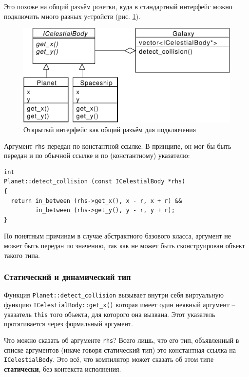 \documentclass[a4paper,12pt,oneside]{article}
\begin{document}
Это похоже на общий разъём розетки, куда в стандартный интерфейс можно подключить много разных уcтройств (рис. \ref{fig:common-intf}).

\begin{figure}[ht]
\centering
\includegraphics[width=1.0\textwidth]{illustrations/common-intf-crop.pdf}
\caption{Открытый интерфейс как общий разъём для подключения}
\label{fig:common-intf}
\end{figure}

Аргумент \lstinline!rhs! передан по константной ссылке. В принципе, он мог бы быть передан и по обычной ссылке и по (константному) указателю:

\begin{lstlisting}
int 
Planet::detect_collision (const ICelestialBody *rhs)
{
  return in_between (rhs->get_x(), x - r, x + r) && 
         in_between (rhs->get_y(), y - r, y + r);
}
\end{lstlisting}

По понятным причинам в случае абстрактного базового класса, аргумент не может быть передан по значению, так как не может быть сконструирован объект такого типа.

\subsubsection{Статический и динамический тип}\label{StatDynPoly}

Функция \lstinline!Planet::detect_collision! вызывает внутри себя виртуальную функцию \lstinline!ICelestialBody::get_x()! которая имеет один неявный аргумент -- указатель \lstinline!this! того объекта, для которого она вызвана. Этот указатель протягивается через формальный аргумент. 

Что можно сказать об аргументе \lstinline!rhs!? Всего лишь, что его тип, объявленный в списке аргументов (иначе говоря статический тип) это константная ссылка на \lstinline!ICelestialBody!. Это всё, что компилятор может сказать об этом типе \textbf{статически}, без контекста исполнения.
\end{document}
